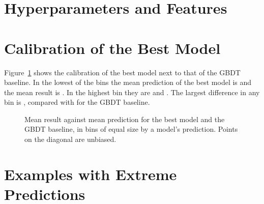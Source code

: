 \documentclass[11pt]{article}
\begin{document}



\clearpage
\appendix

\section{Hyperparameters and Features}

\begin{table}[htbp]\centering\footnotesize
{}
\caption{Hyperparameters of the networks of the fixed sequence, from their
configuration files. \emph{LR} is the peak learning rate. Values shared by
all of them are given below the table.}
\label{tab:settings}
\end{table}

\begin{table}[htbp]\centering\footnotesize
{}
\caption{Hand-crafted features: the inputs of  in addition
to the scalar context features, and of a network whose configuration includes
them.}
\label{tab:hand}
\end{table}

\iflook
\section{Calibration of the Best Model}

Figure~\ref{fig:reliability-best} shows the calibration of the best model
next to that of the GBDT baseline. In the lowest of the
 bins the mean prediction of the best model is
 and the mean result is
. In the highest bin they are
 and .
The largest difference in any bin is ,
compared with  for the GBDT baseline.

\begin{figure}[htbp]\centering
{}
\caption{Mean result against mean prediction for the best model and the GBDT
baseline, in bins of equal size by a model's prediction. Points on the
diagonal are unbiased.}
\label{fig:reliability-best}
\end{figure}

\section{Examples with Extreme Predictions}
\end{document}
